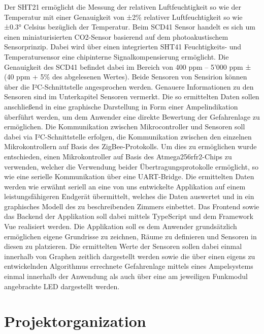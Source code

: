 \documentclass[]{article}
\begin{document}
	Der SHT21 ermöglicht die Messung der relativen Luftfeuchtigkeit so wie der Temperatur mit einer Genauigkeit von ±2\% relativer Luftfeuchtigkeit so wie ±0.3° Celsius bezüglich der Temperatur.\newline
	Beim SCD41 Sensor handelt es sich um einen miniaturisierten CO2-Sensor basierend auf dem photoakustischem Sensorprinzip. Dabei wird über einen integrierten SHT41 Feuchtigkeits- und Temperatursensor eine chipinterne Signalkompensierung ermöglicht. Die Genauigkeit des SCD41 befindet dabei im Bereich von 400 ppm – 5’000 ppm ± (40 ppm + 5\% des abgelesenen Wertes). Beide Sensoren von Sensirion können über die I²C-Schnittstelle angesprochen werden. Genauere Informationen zu den Sensoren sind im Unterkapitel Sensoren vermerkt.\newline
	Die so ermittelten Daten sollen anschließend in eine graphische Darstellung in Form einer Ampelindikation überführt werden, um dem Anwender eine direkte Bewertung der Gefahrenlage zu ermöglichen. Die Kommunikation zwischen Mikrocontroller und Sensoren soll dabei via I²C-Schnittstelle erfolgen, die Kommunikation zwischen den einzelnen Mikrokontrollern auf Basis des ZigBee-Protokolls. Um dies zu ermöglichen wurde entschieden, einen Mikrokontroller auf Basis des Atmega256rfr2-Chips zu verwenden, welcher die Verwendung beider Übertragungsprotokolle ermöglicht, so wie eine serielle Kommunikation über eine UART-Bridge. Die ermittelten Daten werden wie erwähnt seriell an eine von uns entwickelte Applikation auf einem leistungsfähigeren Endgerät übermittelt, welches die Daten auswertet und in ein graphisches Modell des zu beschreibenden Zimmers einbettet. Das Frontend sowie das Backend der Applikation soll dabei mittels TypeScript und dem Framework Vue realisiert werden. Die Applikation soll es dem Anwender grundsätzlich ermöglichen eigene Grundrisse zu zeichnen, Räume zu definieren und Sensoren in diesen zu platzieren. Die ermittelten Werte der Sensoren sollen dabei einmal innerhalb von Graphen zeitlich dargestellt werden sowie die über einen eigens zu entwickelnden Algorithmus errechnete Gefahrenlage mittels eines Ampelsystems einmal innerhalb der Anwendung als auch über eine am jeweiligen Funkmodul angebrachte LED dargestellt werden. 
	
	\section{Projektorganization}
\end{document}
